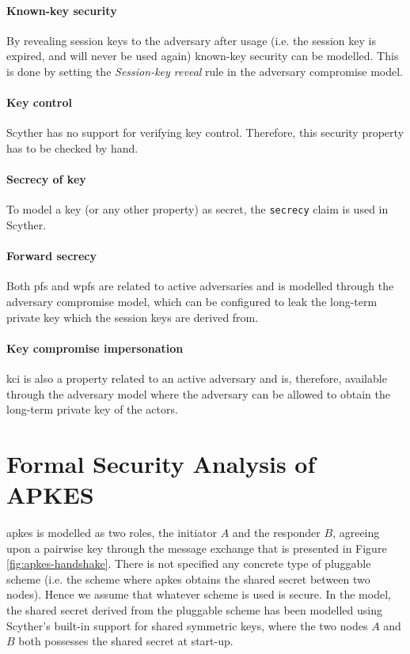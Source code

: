 \paragraph{Known-key security} By revealing session keys to the adversary after usage (i.e. the session key is expired, and will never be used again) known-key security can be modelled. This is done by setting the \emph{Session-key reveal} rule in the adversary compromise model.

\paragraph{Key control} Scyther has no support for verifying key control. Therefore, this security property has to be checked by hand. 

\paragraph{Secrecy of key} To model a key (or any other property) as secret, the \texttt{secrecy} claim is used in Scyther.

\paragraph{Forward secrecy} Both \gls{pfs} and \gls{wpfs} are related to active adversaries and is modelled through the adversary compromise model, which can be configured to leak the long-term private key which the session keys are derived from.

\paragraph{Key compromise impersonation} \gls{kci} is also a property related to an active adversary and is, therefore, available through the adversary model where the adversary can be allowed to obtain the long-term private key of the actors.


\section{Formal Security Analysis of APKES}
\label{sec:apkes-analysis}

\gls{apkes} is modelled as two roles, the initiator $A$ and the responder $B$, agreeing upon a pairwise key through the message exchange that is presented in Figure \ref{fig:apkes-handshake}. There is not specified any concrete type of pluggable scheme (i.e. the scheme where \gls{apkes} obtains the shared secret between two nodes). Hence we assume that whatever scheme is used is secure. In the model, the shared secret derived from the pluggable scheme has been modelled using Scyther's built-in support for shared symmetric keys, where the two nodes $A$ and $B$ both possesses the shared secret at start-up.

